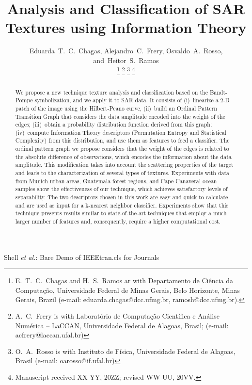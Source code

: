 \documentclass[journal]{IEEEtran}
\newcommand\orcidicon[1]{\href{https://orcid.org/#1}{\mbox{\scalerel*{
				\begin{tikzpicture}[yscale=-1,transform shape]
				\pic{orcidlogo};
				\end{tikzpicture}
			}{|}}}}
\begin{document}
	
	\title{Analysis and Classification of SAR Textures using Information Theory}
	
	\author{Eduarda~T.~C.~Chagas, \orcidicon{0000-0001-9647-0506}
		Alejandro~C.~Frery, \orcidicon{0000-0002-8002-5341}
		Osvaldo~A.~Rosso, \orcidicon{0000-0002-1288-2528}
		and~Heitor~S.~Ramos \orcidicon{0000-0003-4523-6466}
		
		\thanks{E.\ T.\ C.\ Chagas and H.\ S.\ Ramos ar with Departamento de Ci\^encia da Computa\c c\~ao, Universidade Federal de Minas Gerais, Belo Horizonte, Minas Gerais, Brazil (e-mail: eduarda.chagas@dcc.ufmg.br, ramosh@dcc.ufmg.br).}
		\thanks{A.\ C.\ Frery is with Laborat\'orio de Computa\c c\~ao Cient\'ifica e An\'alise Num\'erica -- LaCCAN, Universidade Federal de Alagoas, Brasil; (e-mail: acfrery@laccan.ufal.br)}
		\thanks{O.\ A.\ Rosso is with Instituto de F\'isica, Universidade Federal de Alagoas, Brasil (e-mail: oarosso@if.ufal.br)}
		\thanks{Manuscript received XX YY, 20ZZ; revised WW UU, 20VV.}}
	
	
	{Shell \MakeLowercase{\textit{et al.}}: Bare Demo of IEEEtran.cls for Journals}
	
	\maketitle
	
	\begin{abstract}
		We propose a new technique texture analysis and classification based on the Bandt-Pompe symbolization, and we apply it to SAR data.
		It consists of
		(i)~linearize a 2-D patch of the image using the Hilbert-Peano curve,
		(ii)~build an Ordinal Pattern Transition Graph that considers the data amplitude encoded into the weight of the edges;
		(iii)~obtain a probability distribution function derived from this graph;
		(iv)~compute Information Theory descriptors (Permutation Entropy and Statistical Complexity) from this distribution, and use them as features to feed a classifier.
		The ordinal pattern graph we propose considers that the weight of the edges is related to the absolute difference of observations, which encodes the information about the data amplitude. 
		This modification takes into account the scattering properties of the target and leads to the characterization of several types of textures.
		Experiments with data from Munich urban areas, Guatemala forest regions, and Cape Canaveral ocean samples show the effectiveness of our technique, which achieves satisfactory levels of separability.
		The two descriptors chosen in this work are easy and quick to calculate and are used as input for a k-nearest neighbor classifier.
		Experiments show that this technique presents results similar to state-of-the-art techniques that employ a much larger number of features and, consequently, require a higher computational cost.
	\end{abstract}
	
\end{document}
